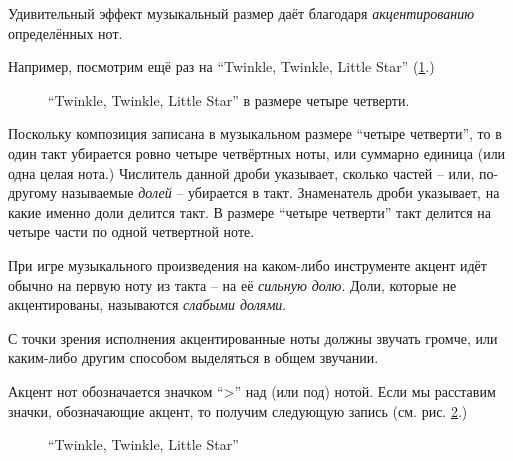 \documentclass[a4paper,twoside]{book}
\newcounter{example-counter}
\begin{document}
Удивительный эффект музыкальный размер даёт благодаря \emph{акцентированию}
определённых нот.

Например, посмотрим ещё раз на ``Twinkle, Twinkle, Little Star''
(\ref{fig:lilypond-musical-scale-example-1}.)

\begin{figure}[ht]
  \caption{``Twinkle, Twinkle, Little Star'' в размере четыре четверти.}
  \centering
  \label{fig:lilypond-musical-scale-example-1}
\end{figure}

Поскольку композиция записана в музыкальном размере ``четыре четверти'', то в
один такт убирается ровно четыре четвёртных ноты, или суммарно единица (или одна
целая нота.)  Числитель данной дроби указывает, сколько частей -- или, по-другому
называемые \emph{долей} -- убирается в такт.  Знаменатель дроби указывает, на
какие именно доли делится такт.  В размере ``четыре четверти'' такт делится на
четыре части по одной четвертной ноте.

При игре музыкального произведения на каком-либо инструменте акцент идёт обычно
на первую ноту из такта -- на её \emph{сильную долю}.  Доли, которые не
акцентированы, называются \emph{слабыми долями}.

С точки зрения исполнения акцентированные ноты должны звучать громче, или
каким-либо другим способом выделяться в общем звучании.

Акцент нот обозначается значком ``>'' над (или под) нотой.  Если мы расставим
значки, обозначающие акцент, то получим следующую запись
(см. рис. \ref{fig:lilypond-musical-scale-example-2}.)

\begin{figure}[ht]
  \caption{``Twinkle, Twinkle, Little Star''}
  \centering
  \label{fig:lilypond-musical-scale-example-2}
\end{figure}
\end{document}
